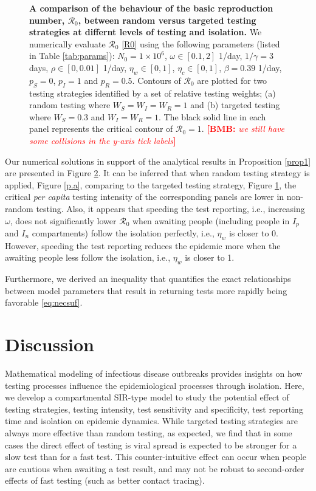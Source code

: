 \documentclass[12pt]{article}
\newcommand{\percap}{\emph{per capita}\xspace}
\newcommand{\Rnum}{\mathcal{R}_0}
\newcommand{\comment}{\showcomment}
\newcommand{\showcomment}[3]{\textcolor{#1}{\textbf{[#2: }\textsl{#3}\textbf{]}}}
\newcommand{\bmb}[1]{\comment{red}{BMB}{#1}}
\theoremstyle{definition} %
\begin{document}
\begin{figure}[h!]
\begin{subfigure}[t]{.45\textwidth}
\caption{}\label{p.b}
\end{subfigure}
\caption{
{\bf A comparison of the behaviour of the basic reproduction number, $\Rnum$, between random versus targeted testing strategies at differnt levels of testing and isolation.}
We numerically evaluate $\Rnum$ \eqref{R0} using the following parameters (listed in Table \ref{tab:params}):
$N_0=1 \times 10^6$, $\omega \in [0.1,2]$ 1/day, $1/\gamma= 3$ days, $\rho \in [0,0.01]$ 1/day, $\eta_w \in [0,1]$, $\eta_c \in [0,1]$, $\beta=0.39$ 1/day, $p_S=0$, $p_I=1$ and $p_R=0.5$. Contours of $\Rnum$ are plotted for two testing strategies identified by a set of relative testing weights; (a) random testing where $W_S=W_I=W_R=1$ and (b) targeted testing where $W_S=0.3$ and $W_I=W_R=1$. The black solid line in each panel represents the critical contour of $\Rnum=1$. \bmb{we still have some collisions in the y-axis tick labels}}
\label{pan}
\end{figure}

Our numerical solutions in support of the analytical results in Proposition \ref{prop1} are presented in Figure \ref{pan}. It can be inferred that when random testing strategy is applied, Figure \ref{p.a}, comparing to the targeted testing strategy, Figure \ref{p.b}, the critical \percap testing intensity of the corresponding panels are lower in non-random testing. Also, it appears that speeding the test reporting, i.e., increasing $\omega$, does not significantly lower $\Rnum$ when awaiting people (including people in $I_p$ and $I_n$ compartments) follow the isolation perfectly, i.e., $\eta_w$ is closer to 0. However, speeding the test reporting reduces the epidemic more when the awaiting people less follow the isolation, i.e., $\eta_w$ is closer to 1. 

Furthermore, we derived an inequality that quantifies the exact relationships between model parameters that result in returning tests more rapidly being favorable \eqref{eq:necsuf}. 

\section{Discussion}

Mathematical modeling of infectious disease outbreaks provides insights on how testing processes influence the epidemiological processes through isolation. 
Here, we develop a compartmental SIR-type model to study the potential effect of testing strategies, testing intensity, test sensitivity and specificity, test reporting time and isolation on epidemic dynamics. 
While targeted testing strategies are always more effective than random testing, as expected, we find that in some cases the direct effect of testing is viral spread is expected to be stronger for a slow test than for a fast test. This counter-intuitive effect can occur when people are cautious when awaiting a test result, and may not be robust to second-order effects of fast testing (such as better contact tracing).
\end{document}
